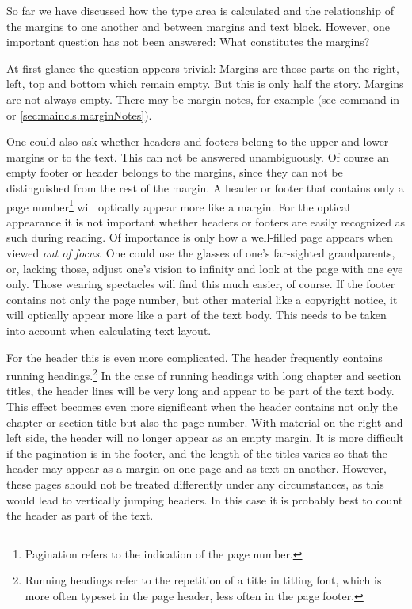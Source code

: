 \begin{Declaration}
\end{Declaration}%
\begin{Explain}%
  So far we have discussed how the type area is
  calculated and the relationship of the
  margins to one another and between margins and text
  block. However, one important question has not been answered: What
  constitutes the margins?

  At first glance the question appears trivial: Margins are those
  parts on the right, left, top and bottom which remain empty. But
  this is only half the story. Margins are not always empty. There may
  be margin notes, for example (see  command in
  \cite{lshort} or \autoref{sec:maincls.marginNotes}).

  One could also ask whether headers and
  footers belong to the upper and lower margins or
  to the text. This can not be answered unambiguously. Of course an
  empty footer or header belongs to the margins, since they can not be
  distinguished from the rest of the margin. A header or footer that
  contains only a page
  number\footnote{Pagination refers to
    the indication of the page number.} will optically appear more
  like a margin. For the optical appearance it is not important
  whether headers or footers are easily recognized as such during
  reading.  Of importance is only how a well-filled page appears when
  viewed \emph{out of focus}. One could use the glasses of one's
  far-sighted grandparents, or, lacking those, adjust one's vision to
  infinity and look at the page with one eye only. Those wearing
  spectacles will find this much easier, of course.  If the footer
  contains not only the page number, but other material like a
  copyright notice, it will optically appear more like a part of the
  text body.  This needs to be taken into account when calculating
  text layout.

  For the header this is even more complicated. The header frequently
  contains running headings.\footnote{Running headings refer to the repetition of a
    title in titling font, which is more often typeset in the page
    header, less often in the page footer.}  In the case of running
  headings with long chapter and section titles, the header lines will
  be very long and appear to be part of the text body.  This effect
  becomes even more significant when the header contains not only the
  chapter or section title but also the page number. With material on
  the right and left side, the header will no longer appear as an
  empty margin. It is more difficult if the pagination is in the
  footer, and the length of the titles varies so that the header may
  appear as a margin on one page and as text on another.  However,
  these pages should not be treated differently under any
  circumstances, as this would lead to vertically jumping headers. In
  this case it is probably best to count the header as part of the
  text.


\end{Explain}
